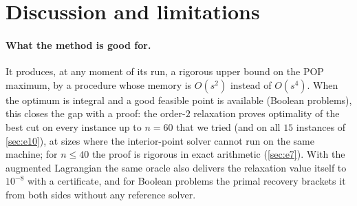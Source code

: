 \documentclass[a4paper,11pt]{article}
\theoremstyle{plain}
\theoremstyle{definition}
\theoremstyle{remark}
\begin{document}
\section{Discussion and limitations}\label{sec:disc}
\paragraph{What the method is good for.} It produces, at any moment of its run, a rigorous upper bound on the POP maximum, by a procedure whose memory is $O(s^2)$ instead of $O(s^4)$. When the optimum is integral and a good feasible point is available (Boolean problems), this closes the gap with a proof: the order-$2$ relaxation proves optimality of the best cut on every instance up to $n=60$ that we tried (and on all $15$ instances of \cref{sec:e10}), at sizes where the interior-point solver cannot run on the same machine; for $n\le40$ the proof is rigorous in exact arithmetic (\cref{sec:e7}). With the augmented Lagrangian the same oracle also delivers the relaxation value itself to $10^{-8}$ with a certificate, and for Boolean problems the primal recovery brackets it from both sides without any reference solver.
\end{document}
